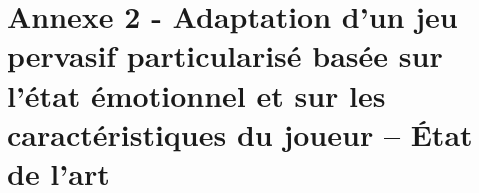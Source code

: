 \documentclass{article}
\begin{document}
\section{Annexe 2 - Adaptation d’un jeu pervasif particularisé basée sur l'état émotionnel et sur les caractéristiques du joueur – État de l’art}\label{ann:eda}
	

%	

%		



\end{document}
